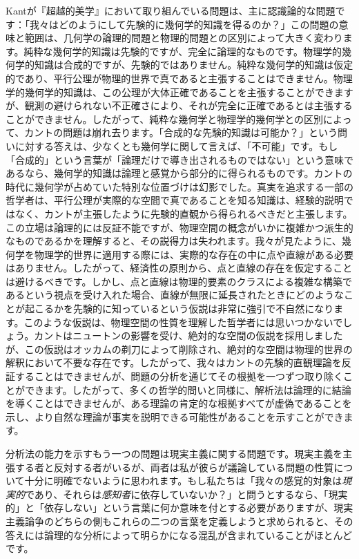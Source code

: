 \documentclass[a4paper,11pt,openany]{ltjsbook}
\begin{document}
 Kantが『超越的美学』において取り組んでいる問題は、主に認識論的な問題です：「我々はどのようにして先験的に幾何学的知識を得るのか？」この問題の意味と範囲は、几何学の論理的問題と物理的問題との区別によって大きく変わります。純粋な幾何学的知識は先験的ですが、完全に論理的なものです。物理学的幾何学的知識は合成的ですが、先験的ではありません。純粋な幾何学的知識は仮定的であり、平行公理が物理的世界で真であると主張することはできません。物理学的幾何学的知識は、この公理が大体正確であることを主張することができますが、観測の避けられない不正確さにより、それが完全に正確であるとは主張することができません。したがって、純粋な幾何学と物理学的幾何学との区別によって、カントの問題は崩れ去ります。「合成的な先験的知識は可能か？」という問いに対する答えは、少なくとも幾何学に関して言えば、「不可能」です。もし「合成的」という言葉が「論理だけで導き出されるものではない」という意味であるなら、幾何学的知識は論理と感覚から部分的に得られるものです。カントの時代に幾何学が占めていた特別な位置づけは幻影でした。真実を追求する一部の哲学者は、平行公理が実際的な空間で真であることを知る知識は、経験的説明ではなく、カントが主張したように先験的直観から得られるべきだと主張します。この立場は論理的には反証不能ですが、物理空間の概念がいかに複雑かつ派生的なものであるかを理解すると、その説得力は失われます。我々が見たように、幾何学を物理学的世界に適用する際には、実際的な存在の中に点や直線がある必要はありません。したがって、経済性の原則から、点と直線の存在を仮定することは避けるべきです。しかし、点と直線は物理的要素のクラスによる複雑な構築であるという視点を受け入れた場合、直線が無限に延長されたときにどのようなことが起こるかを先験的に知っているという仮説は非常に強引で不自然になります。このような仮説は、物理空間の性質を理解した哲学者には思いつかないでしょう。カントはニュートンの影響を受け、絶対的な空間の仮説を採用しましたが、この仮説はオッカムの剃刀によって削除され、絶対的な空間は物理的世界の解釈において不要な存在です。したがって、我々はカントの先験的直観理論を反証することはできませんが、問題の分析を通じてその根拠を一つずつ取り除くことができます。したがって、多くの哲学的問いと同様に、解析法は論理的に結論を導くことはできませんが、ある理論の肯定的な根拠すべてが虚偽であることを示し、より自然な理論が事実を説明できる可能性があることを示すことができます。

分析法の能力を示すもう一つの問題は現実主義に関する問題です。現実主義を主張する者と反対する者がいるが、両者は私が彼らが議論している問題の性質について十分に明確でないように思われます。もし私たちは「我々の感覚的対象は\textit{現実的}であり、それらは\textit{感知者}に依存していないか？」と問うとするなら、「現実的」と「依存しない」という言葉に何か意味を付とする必要がありますが、現実主義論争のどちらの側もこれらの二つの言葉を定義しようと求められると、その答えには論理的な分析によって明らかになる混乱が含まれていることがほとんどです。
\end{document}
